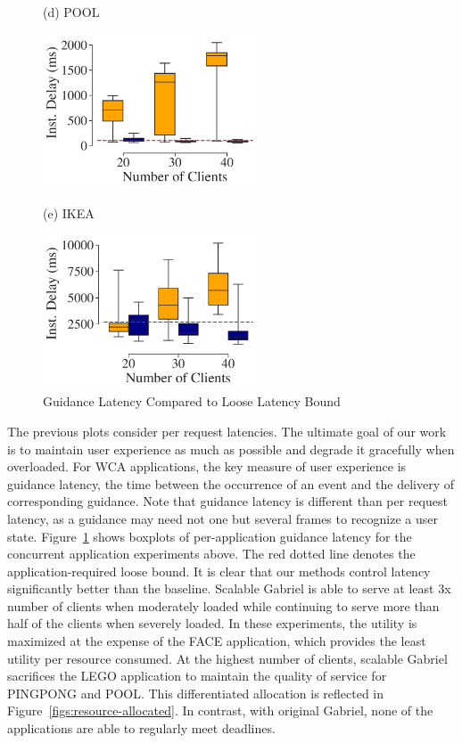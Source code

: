 \begin{figure}[]
  \begin{turn}{90}{\hspace{0.6in}\small (d)
      POOL}\end{turn}\hspace{0.2in}\includegraphics[width=2.5in, trim=0em 0em 0em 0em,
    clip]{FIGS/fig-sec6-latency-pool.pdf}\\[0.08in]
  \vspace{0in}
  \begin{turn}{90}{\hspace{0.6in}\small (e) IKEA}\end{turn}\hspace{0.2in}\includegraphics[width=2.5in, trim=0em 0em 0em 0em, clip]{FIGS/fig-sec6-latency-ikea.pdf}
  \caption{Guidance Latency Compared to Loose Latency Bound}
  \label{figs:inst-delay}
\end{figure}

The previous plots consider per request latencies. The ultimate goal of our work
is to maintain user experience as much as possible and degrade it gracefully
when overloaded. For WCA applications, the key measure of user experience is
guidance latency, the time between the occurrence of an event and the delivery
of corresponding guidance. Note that guidance latency is different than per
request latency, as a guidance may need not one but several frames to recognize
a user state. Figure~\ref{figs:inst-delay} shows boxplots of per-application
guidance latency for the concurrent application experiments above. The red
dotted line denotes the application-required loose bound. It is clear that our
methods control latency significantly better than the baseline. Scalable Gabriel
is able to serve at least 3x number of clients when moderately loaded while
continuing to serve more than half of the clients when severely loaded. In these
experiments, the utility is maximized at the expense of the FACE application,
which provides the least utility per resource consumed. At the highest number of
clients, scalable Gabriel sacrifices the LEGO application to maintain the
quality of service for PINGPONG and POOL. This differentiated allocation is
reflected in Figure~\ref{figs:resource-allocated}. In contrast, with original
Gabriel, none of the applications are able to regularly meet deadlines.